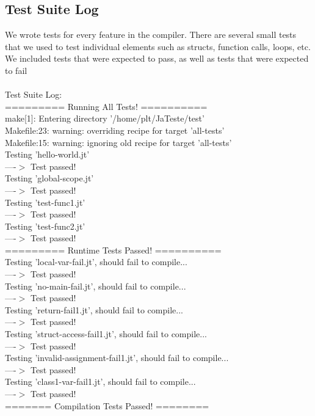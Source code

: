 \documentclass{article}
\begin{document}
\subsection{Test Suite Log}
We wrote tests for every feature in the compiler. There are several small tests that we used to test individual elements such as structs, function calls, loops, etc. We included tests that were expected to pass, as well as tests that were expected to fail\\
\\
Test Suite Log:\\
========= Running All Tests! ========== \\
make[1]: Entering directory '/home/plt/JaTeste/test' \\
Makefile:23: warning: overriding recipe for target 'all-tests' \\
Makefile:15: warning: ignoring old recipe for target 'all-tests' \\
Testing 'hello-world.jt' \\
  ----$>$  Test passed!\\
Testing 'global-scope.jt'\\
  ----$>$  Test passed!\\
Testing 'test-func1.jt'\\
  ----$>$  Test passed!\\
Testing 'test-func2.jt'\\
  ----$>$  Test passed!\\
========= Runtime Tests Passed! ==========\\
Testing 'local-var-fail.jt', should fail to compile...\\
  ----$>$  Test passed!\\
Testing 'no-main-fail.jt', should fail to compile...\\
  ----$>$  Test passed!\\
Testing 'return-fail1.jt', should fail to compile...\\
  ----$>$  Test passed!\\
Testing 'struct-access-fail1.jt', should fail to compile...\\
  ----$>$  Test passed!\\
Testing 'invalid-assignment-fail1.jt', should fail to compile...\\
  ----$>$  Test passed!\\
  Testing 'class1-var-fail1.jt', should fail to compile...\\
  ----$>$  Test passed! \\
======= Compilation Tests Passed! ========\\
\end{document}
